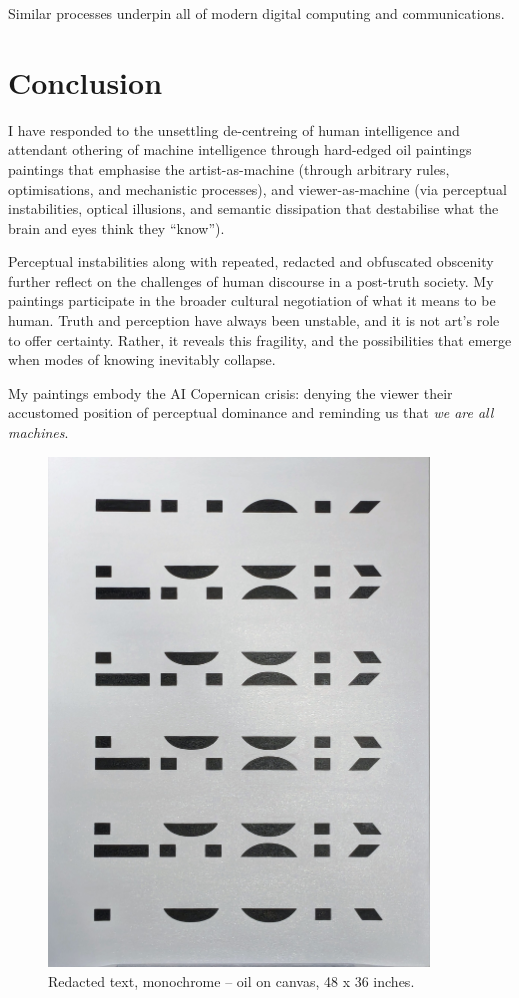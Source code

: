\documentclass[12pt]{article}
\begin{document}
Similar processes underpin all of modern digital computing and
communications.\cite{shannon1948}

\section{Conclusion}
I have responded to the unsettling de-centreing of human intelligence
and attendant othering of machine intelligence through hard-edged oil
paintings paintings that emphasise the artist-as-machine (through
arbitrary rules, optimisations, and mechanistic processes), and
viewer-as-machine (via perceptual instabilities, optical illusions,
and semantic dissipation that destabilise what the brain and eyes
think they ``know''). 

Perceptual instabilities along with repeated, redacted and obfuscated
obscenity further reflect on the challenges of human discourse in a
post-truth society. My paintings participate in the broader cultural
negotiation of what it means to be human. Truth and perception have
always been unstable, and it is not art's role to offer
certainty. Rather, it reveals this fragility, and the possibilities
that emerge when modes of knowing inevitably collapse.

My paintings embody the AI Copernican crisis:
denying the viewer their accustomed position of perceptual dominance
and reminding us that \emph{we are all machines}.

\newpage
\begin{figure}[htbp]
  \centering
  \includegraphics*[width=0.9\textwidth]{black.jpg}
  \caption{Redacted text, monochrome -- oil on canvas, 48 x 36 inches.}
  \label{fig:black}
\end{figure}
\end{document}
